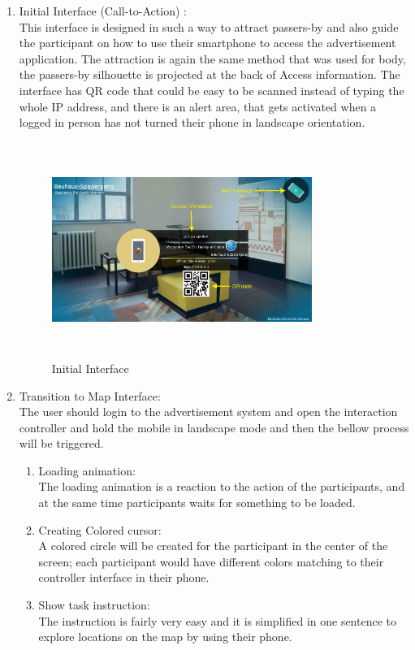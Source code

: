 \begin{enumerate}

\item Initial Interface (Call-to-Action) : \\
This interface is designed in such a way to attract passers-by and also guide the participant on how to use their smartphone to access the advertisement application. The attraction is again the same method that was used for body, the passers-by silhouette is projected at the back of Access information. The interface has QR code that could be easy to be scanned instead of typing the whole IP address, and there is an alert area, that gets activated when a logged in person has not turned their phone in landscape orientation.

\begin{figure}[H]
    \centering
    \includegraphics[width=0.8\textwidth,height=70mm]{Figures/7/mobile_interactive/first_interface}
    \caption{Initial Interface}%
    \label{fig:mobile_firstinterface}%
\end{figure}



\item Transition to Map Interface: \\
The user should login to the advertisement system and open the interaction controller and hold the mobile in landscape mode and then the bellow process will be triggered. 

\begin{enumerate}
\item Loading animation:\\
 The loading animation is a reaction to the action of the participants, and at the same time participants waits for something to be loaded.
\item  Creating Colored cursor: \\
A colored circle will be created for the participant in the center of the screen; each participant would have different colors matching to their controller interface in their phone.
\item Show task instruction:  \\
The instruction is fairly very easy and it is simplified in one sentence to explore locations on the map by using their phone.


\end{enumerate}
\end{enumerate}

